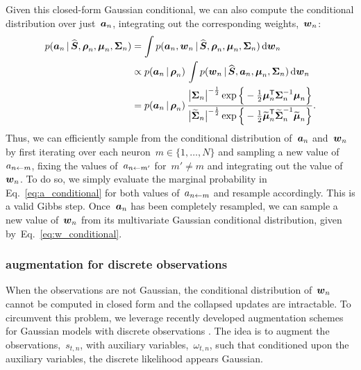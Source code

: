 Given this closed-form Gaussian conditional, we can also compute
the conditional distribution over just~$\boldsymbol{a}_n$, integrating out
the corresponding weights,~$\boldsymbol{w}_n$:
\begin{align}
  p(\boldsymbol{a}_n \,|\, \widehat{\boldsymbol{S}}, \boldsymbol{\rho}_n, \boldsymbol{\mu}_n, \boldsymbol{\Sigma}_n)
  &= \int p(\boldsymbol{a}_n, \boldsymbol{w}_n \,|\, \widehat{\boldsymbol{S}}, \boldsymbol{\rho}_n, \boldsymbol{\mu}_n, \boldsymbol{\Sigma}_n) \, \mathrm{d} \boldsymbol{w}_n \\
  &\propto p(\boldsymbol{a}_n \,|\, \boldsymbol{\rho}_n) \, \int p(\boldsymbol{w}_n \,|\, \widehat{\boldsymbol{S}}, \boldsymbol{a}_n, \boldsymbol{\mu}_n, \boldsymbol{\Sigma}_n) \, \mathrm{d} \boldsymbol{w}_n \\
  \label{eq:a_conditional}
  &= p(\boldsymbol{a}_n \,|\, \boldsymbol{\rho}_n) \, \frac{\big| \boldsymbol{\Sigma}_n \big|^{-\frac{1}{2}} \exp \Big \{-\frac{1}{2} \boldsymbol{\mu}_n^{\mathsf{T}} \boldsymbol{\Sigma}_n^{-1} \boldsymbol{\mu}_n \Big \} }
  {\big| \widetilde{\boldsymbol{\Sigma}}_n \big|^{-\frac{1}{2}} \exp \Big \{-\frac{1}{2} \widetilde{\boldsymbol{\mu}}_n^{\mathsf{T}} \widetilde{\boldsymbol{\Sigma}}_n^{-1} \widetilde{\boldsymbol{\mu}}_n \Big \}}.
\end{align}
Thus, we can efficiently sample from the conditional
distribution of~$\boldsymbol{a}_n$ and~$\boldsymbol{w}_n$ by first iterating
over each neuron~${m \in \{1, \ldots, N\}}$ and sampling
a new value of~$a_{n \leftarrow m}$, fixing the values of~$a_{n \leftarrow m'}$
for~$m' \neq m$ and integrating out the value of~$\boldsymbol{w}_n$.
To do so, we simply evaluate the marginal probability in Eq.~\ref{eq:a_conditional}
for both values of~$a_{n \leftarrow m}$ and resample accordingly.
This is a valid Gibbs step. Once~$\boldsymbol{a}_n$ has been completely
resampled, we can sample a new value of~$\boldsymbol{w}_n$ from its multivariate
Gaussian conditional distribution, given by~Eq.~\ref{eq:w_conditional}.

\subsubsection{\polyagamma augmentation for discrete observations}
When the observations are not Gaussian, the conditional distribution
of~$\boldsymbol{w}_n$ cannot be computed in closed form and the collapsed
updates are intractable. To circumvent this problem, we leverage
recently developed augmentation schemes for Gaussian models with
discrete observations \cite{polson2013bayesian, Pillow2012}. The
idea is to augment the observations,~$s_{t,n}$, with auxiliary
variables,~$\omega_{t,n}$, such that conditioned upon the
auxiliary variables, the discrete likelihood appears Gaussian.

